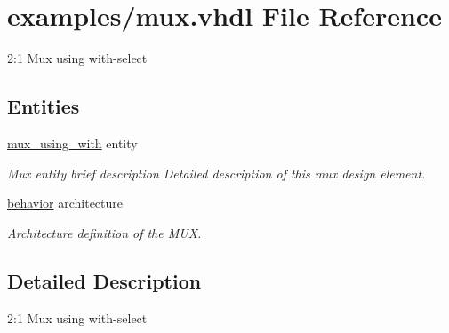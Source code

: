 \hypertarget{mux_8vhdl}{}\section{examples/mux.vhdl File Reference}
\label{mux_8vhdl}


2\+:1 Mux using with-\/select  


\subsection*{Entities}
\begin{DoxyCompactItemize}
\item 
\mbox{\hyperlink{classmux__using__with}{mux\+\_\+using\+\_\+with}} entity
\begin{DoxyCompactList}\small\item\em Mux entity brief description Detailed description of this mux design element. \end{DoxyCompactList}\item 
\mbox{\hyperlink{classmux__using__with_1_1behavior}{behavior}} architecture
\begin{DoxyCompactList}\small\item\em Architecture definition of the M\+UX. \end{DoxyCompactList}\end{DoxyCompactItemize}


\subsection{Detailed Description}
2\+:1 Mux using with-\/select 

